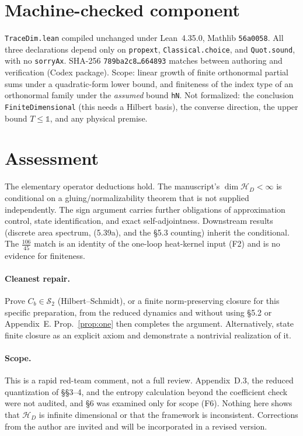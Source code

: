 \documentclass[11pt]{article}
\theoremstyle{remark}
\newcommand{\HD}{\mathcal H_D}
\newcommand{\one}{\mathbb 1}
\begin{document}
\section{Machine-checked component}
\texttt{TraceDim.lean} compiled unchanged under Lean~4.35.0, Mathlib
\texttt{56a0058}. All three declarations depend only on \texttt{propext},
\texttt{Classical.choice}, and \texttt{Quot.sound}, with no \texttt{sorryAx}. SHA-256
\texttt{789ba2c8\ldots664893} matches between authoring and verification (Codex
package). Scope: linear growth of finite orthonormal partial sums under a quadratic-form
lower bound, and finiteness of the index type of an orthonormal family under the
\emph{assumed} bound \texttt{hN}. Not formalized: the conclusion
\texttt{FiniteDimensional} (this needs a Hilbert basis), the converse direction, the
upper bound $T\le\one$, and any physical premise.

\section{Assessment}
The elementary operator deductions hold. The manuscript's $\dim\HD<\infty$ is
conditional on a gluing/normalizability theorem that is not supplied independently.
The sign argument carries further obligations of approximation control,
state identification, and exact self-adjointness. Downstream results (discrete area
spectrum, (5.39a), and the \S5.3 counting) inherit the conditional. The
$\tfrac{106}{45}$ match is an identity of the one-loop heat-kernel input (F2) and is no
evidence for finiteness.

\paragraph{Cleanest repair.} Prove $C_b\in\mathcal S_2$ (Hilbert--Schmidt), or a finite
norm-preserving closure for this specific preparation, from the reduced dynamics and
without using \S5.2 or Appendix~E. Prop.~\ref{prop:one} then completes the argument.
Alternatively, state finite closure as an explicit axiom and demonstrate a nontrivial
realization of it.

\paragraph{Scope.} This is a rapid red-team comment, not a full review.
Appendix~D.3, the reduced quantization of \S\S3--4, and the entropy calculation beyond
the coefficient check were not audited, and \S6 was examined only for scope (F6). Nothing here shows that $\HD$ is
infinite dimensional or that the framework is inconsistent. Corrections from the author
are invited and will be incorporated in a revised version.
\end{document}
